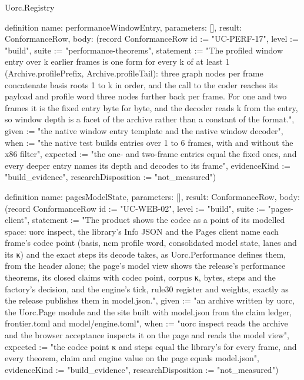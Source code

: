 \begin{lexlean}{Uorc.Registry}
\begin{semanticmodule}
definition{
  name: performanceWindowEntry,
  parameters: [],
  result: ConformanceRow,
  body: (record ConformanceRow {id := "UC-PERF-17", level := "build", suite := "performance-theorems", statement := "The profiled window entry over k earlier frames is one form for every k of at least 1 (Archive.profilePrefix, Archive.profileTail): three graph nodes per frame concatenate basis roots 1 to k in order, and the call to the coder reaches its payload and profile word three nodes further back per frame. For one and two frames it is the fixed entry byte for byte, and the decoder reads k from the entry, so window depth is a facet of the archive rather than a constant of the format.", given := "the native window entry template and the native window decoder", when := "the native test builds entries over 1 to 6 frames, with and without the x86 filter", expected := "the one- and two-frame entries equal the fixed ones, and every deeper entry names its depth and decodes to its frame", evidenceKind := "build_evidence", researchDisposition := "not_measured"})
}

definition{
  name: pagesModelState,
  parameters: [],
  result: ConformanceRow,
  body: (record ConformanceRow {id := "UC-WEB-02", level := "build", suite := "pages-client", statement := "The product shows the codec as a point of its modelled space: uorc inspect, the library's Info JSON and the Pages client name each frame's codec point (basis, ncm profile word, consolidated model state, lanes and its κ) and the exact steps its decode takes, as Uorc.Performance defines them, from the header alone; the page's model view shows the release's performance theorems, its closed claims with codec point, corpus κ, bytes, steps and the factory's decision, and the engine's tick, rule30 register and weights, exactly as the release publishes them in model.json.", given := "an archive written by uorc, the Uorc.Page module and the site built with model.json from the claim ledger, frontier.toml and model/engine.toml", when := "uorc inspect reads the archive and the browser acceptance inspects it on the page and reads the model view", expected := "the codec point κ and steps equal the library's for every frame, and every theorem, claim and engine value on the page equals model.json", evidenceKind := "build_evidence", researchDisposition := "not_measured"})
}


\end{semanticmodule}
\end{lexlean}
